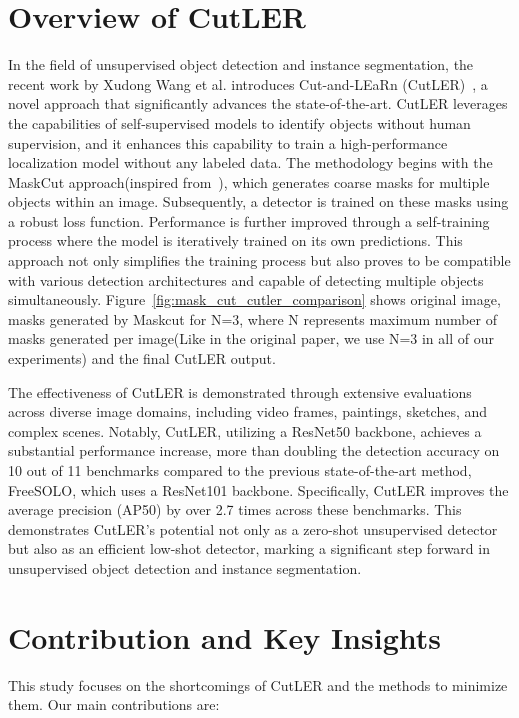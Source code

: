 \section{Overview of CutLER}
In the field of unsupervised object detection and instance segmentation, the recent work by Xudong Wang et al. introduces Cut-and-LEaRn (CutLER)~\cite{wang2023cut}, a novel approach that significantly advances the state-of-the-art. CutLER leverages the capabilities of self-supervised models to identify objects without human supervision, and it enhances this capability to train a high-performance localization model without any labeled data. The methodology begins with the MaskCut approach(inspired from~\cite{wang2022tokencut}), which generates coarse masks for multiple objects within an image. Subsequently, a detector is trained on these masks using a robust loss function. Performance is further improved through a self-training process where the model is iteratively trained on its own predictions. This approach not only simplifies the training process but also proves to be compatible with various detection architectures and capable of detecting multiple objects simultaneously. Figure~\ref{fig:mask_cut_cutler_comparison} shows original image, masks generated by Maskcut for N=3, where N represents maximum number of masks generated per image(Like in the original paper, we use N=3 in all of our experiments) and the final CutLER output.

The effectiveness of CutLER is demonstrated through extensive evaluations across diverse image domains, including video frames, paintings, sketches, and complex scenes. Notably, CutLER, utilizing a ResNet50 backbone, achieves a substantial performance increase, more than doubling the detection accuracy on 10 out of 11 benchmarks compared to the previous state-of-the-art method, FreeSOLO, which uses a ResNet101 backbone. Specifically, CutLER improves the average precision (AP50) by over 2.7 times across these benchmarks. This demonstrates CutLER's potential not only as a zero-shot unsupervised detector but also as an efficient low-shot detector, marking a significant step forward in unsupervised object detection and instance segmentation.

\section{Contribution and Key Insights}

This study focuses on the shortcomings of CutLER and the methods to minimize them. Our main contributions are:

